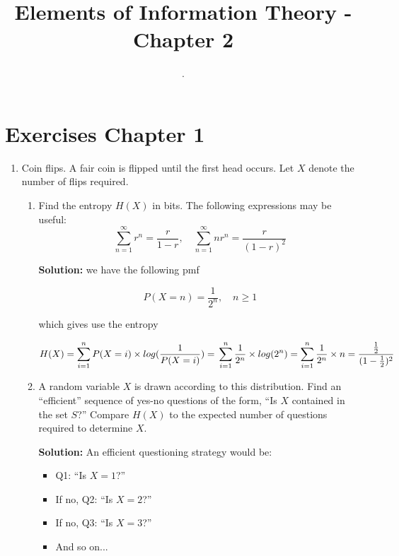 \documentclass{article}
\title{Elements of Information Theory - Chapter 2}
\begin{document}
\author{.}
\maketitle

\cite{shannon1948}

\section{Exercises Chapter 1}

\begin{enumerate}
    \item Coin flips. A fair coin is flipped until the first head occurs. Let $X$ denote the number of flips required.
    \begin{enumerate}
        \item Find the entropy $H(X)$ in bits. The following expressions may be useful:
        \[
            \sum_{n=1}^{\infty} r^n = \frac{r}{1-r}, \quad \sum_{n=1}^{\infty} nr^n = \frac{r}{(1-r)^2}
        \]

        \textbf{Solution:}
        we have the following pmf 

        \[
            P(X = n) = \frac{1}{2^n}, \quad n \geq 1
        \]

        which gives use the entropy

        \[
        H(X) = \sum_{i=1}^{n} P(X=i) \times log(\frac{1}{P(X=i)}) = \\
        \sum_{i=1}^{n} \frac{1}{2^n} \times log(2^n) = \sum_{i=1}^{n} \frac{1}{2^n} \times n =  \frac{\frac{1}{2}}{(1-\frac{1}{2})^2} 
        \]

        
        \item A random variable $X$ is drawn according to this distribution. Find an ``efficient'' sequence of yes-no questions of the form, ``Is $X$ contained in the set $S$?'' Compare $H(X)$ to the expected number of questions required to determine $X$.
        
        \textbf{Solution:} An efficient questioning strategy would be:
        \begin{itemize}
            \item Q1: ``Is $X = 1$?''
            \item If no, Q2: ``Is $X = 2$?''
            \item If no, Q3: ``Is $X = 3$?''
            \item And so on...
        \end{itemize}
        

\end{enumerate}
\end{enumerate}
\end{document}
